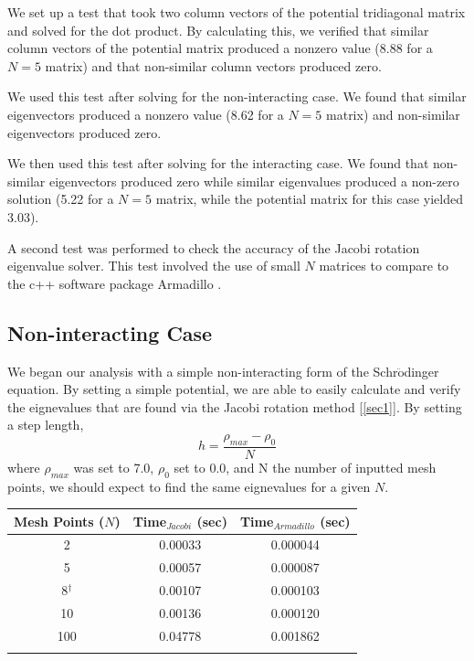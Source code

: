 \documentclass[%
reprint,
superscriptaddress,
showpacs,
nofootinbib,
bibnotes,amsmath,amssymb,aps,
prc, 
]{revtex4-1}
\begin{document}
	We set up a test that took two column vectors of the potential tridiagonal matrix and solved for the dot product.  By calculating this, we verified that similar column vectors of the potential matrix produced a nonzero value (8.88 for a $N=5$ matrix) and that non-similar column vectors produced zero.
	
	We used this test after solving for the non-interacting case.  We found that similar eigenvectors produced a nonzero value (8.62 for a $N=5$ matrix) and non-similar eigenvectors produced zero.
	
	We then used this test after solving for the interacting case.  We found that non-similar eigenvectors produced zero while similar eigenvalues produced a non-zero solution (5.22 for a $N=5$ matrix, while the potential matrix for this case yielded 3.03).
	
	A second test was performed to check the accuracy of the Jacobi rotation eigenvalue solver.  This test involved the use of small $N$ matrices to compare to the c++ software package Armadillo \cite{Armadillo}. 
	
	\subsection{Non-interacting Case}
	
	We began our analysis with a simple non-interacting form of the Schr$\ddot{\textrm{o}}$dinger equation.  By setting a simple potential, we are able to easily calculate and verify the eignevalues that are found via the Jacobi rotation method [\ref{sec1}].  By setting a step length, \begin{equation}
	h=\frac{\rho_{max}-\rho_{0}}{N}
	\end{equation} where $\rho_{max}$ was set to 7.0, $\rho_{0}$ set to 0.0, and N the number of inputted mesh points, we should expect to find the same eignevalues for a given $N$.
	
		\begin{center}
		\begin{tabular}{ccc}
			\hline \hline
			Mesh Points ($N$) &  Time$_{Jacobi}$ (sec) & Time$_{Armadillo}$ (sec)\\
			\hline
			2 & 0.00033 & 0.000044\\
			5 & 0.00057 & 0.000087\\
			8$^{\dagger}$ & 0.00107 & 0.000103\\
			10 & 0.00136 & 0.000120\\
			100 & 0.04778 & 0.001862\\
			\hline
			\label{timetable}
		\end{tabular}
	\end{center}
\end{document}
